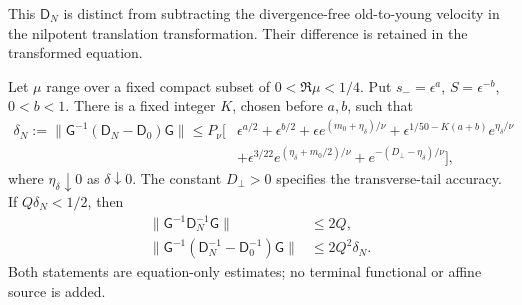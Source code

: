 This \(\mathsf D_N\) is distinct from subtracting the divergence-free
old-to-young velocity in the nilpotent translation transformation.
Their difference is retained in the transformed equation.

\begin{proposition}\label{near:equation-comparison}
Let \(\mu\) range over a fixed compact subset of \(0<\Re\mu<1/4\).
Put \(s_-=\epsilon^a\), \(S=\epsilon^{-b}\), \(0<b<1\).
There is a fixed integer \(K\), chosen before \(a,b\), such that
\begin{equation}\label{near:deltaN}
 \begin{split}
 \delta_N:=\|\mathsf G^{-1}(\mathsf D_N-\mathsf D_0)\mathsf G\|
 \le P_\nu\big[&\epsilon^{a/2}+\epsilon^{b/2}
       +\epsilon e^{(m_0+\eta_\delta)/\nu}
       +\epsilon^{1/50-K(a+b)}e^{\eta_\delta/\nu}\\
       &+\epsilon^{3/22}e^{(\eta_\delta+m_0/2)/\nu}
       +e^{-(D_\perp-\eta_\delta)/\nu}\big],
 \end{split}
\end{equation}
where \(\eta_\delta\downarrow0\) as \(\delta\downarrow0\).
The constant \(D_\perp>0\) specifies the transverse-tail accuracy.
If \(Q\delta_N<1/2\), then
\begin{equation}\label{near:inverse-comparison}
 \begin{split}
 \|\mathsf G^{-1}\mathsf D_N^{-1}\mathsf G\|&\le2Q,\\
 \|\mathsf G^{-1}(\mathsf D_N^{-1}-\mathsf D_0^{-1})\mathsf G\|
       &\le2Q^2\delta_N.
 \end{split}
\end{equation}
Both statements are equation-only estimates; no terminal functional
or affine source is added.
\end{proposition}

